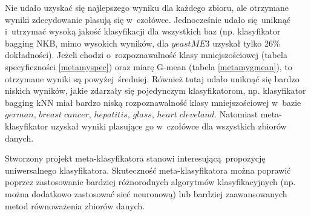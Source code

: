 Nie udało uzyskać się najlepszego wyniku dla każdego zbioru, ale otrzymane wyniki zdecydowanie plasują się w~czołówce. Jednocześnie udało się uniknąć i~utrzymać wysoką jakość klasyfikacji dla wszystkich baz (np. klasyfikator bagging NKB, mimo wysokich wyników, dla $yeastME3$ uzyskał tylko 26\% dokładności). Jeżeli chodzi o~rozpoznawalność klasy mniejszościowej (tabela specyficzności \ref{metamyspec}) oraz miarę G-mean (tabela \ref{metamygmean}), to otrzymane wyniki są powyżej średniej. Również tutaj udało uniknąć się bardzo niskich wyników, jakie zdarzały się pojedynczym klasyfikatorom, np. klasyfikator bagging kNN miał bardzo niską rozpoznawalność klasy mniejszościowej w~bazie $german$, $breast\; cancer$, $hepatitis$, $glass$, $heart\; cleveland$. Natomiast meta-klasyfikator uzyskał wyniki plasujące go w~czołówce dla wszystkich zbiorów danych. \par
Stworzony projekt meta-klasyfikatora stanowi interesującą propozycję uniwersalnego klasyfikatora. Skuteczność meta-klasyfikatora można poprawić poprzez zastosowanie bardziej różnorodnych algorytmów klasyfikacyjnych (np. można dodatkowo zastosować sieć neuronową) lub bardziej zaawansowanych metod równoważenia zbiorów danych.

	

